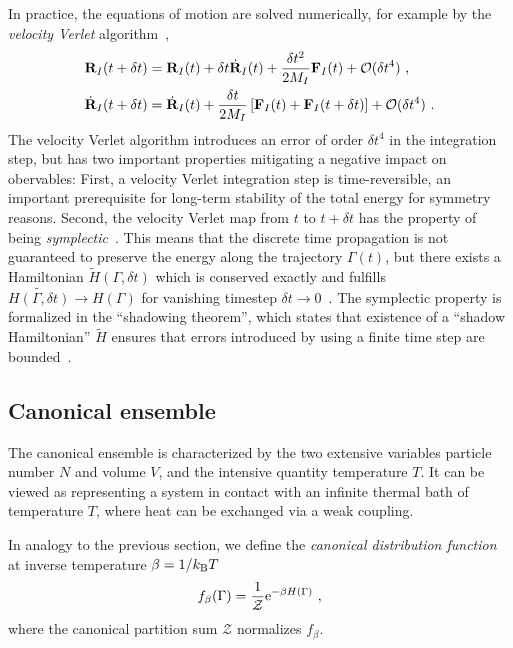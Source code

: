 In practice, the equations of motion are solved numerically, for example by the \emph{velocity Verlet} algorithm~,
\begin{subequations}
\begin{align}
	{\bf R}_I (t + \delta t) 
		&= {\bf R}_I (t) + \delta t \dot{{\bf R}}_I (t) + \frac{\delta t^2}{2 M_I} {\bf F}_I(t) + \mathcal{O} (\delta t^4)~, \\
	\dot{{\bf R}}_I (t + \delta t) 
		&= \dot{{\bf R}}_I (t) + \frac{\delta t}{2 M_I} \left[{\bf F}_I(t) + {\bf F}_I (t + \delta t)\right] + \mathcal{O} (\delta t^4)~.
\end{align}
\label{eq:VelocityVerlet}
\end{subequations}
The velocity Verlet algorithm introduces an error of order $\delta t^4$ in the integration step, but has two important properties mitigating a negative impact on obervables: First, a velocity Verlet integration step is time-reversible, an important prerequisite for long-term stability of the total energy for symmetry reasons. Second, the velocity Verlet map from $t$ to $t + \delta t$ has the property of being \emph{symplectic}~\cite[p.\,101]{Tuckerman}. This means that the discrete time propagation is not guaranteed to preserve the energy along the trajectory $\Gamma(t)$, but there exists a Hamiltonian $\tilde{H} (\Gamma, \delta t)$ which is conserved exactly and fulfills $\tilde{H (\Gamma, \delta t)} \to H(\Gamma)$ for vanishing timestep $\delta t \to 0$~\cite[p.\,121]{Tuckerman}. The symplectic property is formalized in the ``shadowing theorem'', which states that existence of a ``shadow Hamiltonian'' $\tilde H$ ensures that errors introduced by using a finite time step are bounded~.

\subsection{Canonical ensemble}
The canonical ensemble is characterized by the two extensive variables particle number $N$ and volume $V$, and the intensive quantity temperature $T$. It can be viewed as representing a system in contact with an infinite thermal bath of temperature $T$, where heat can be exchanged via a weak coupling.

In analogy to the previous section, we define the \emph{canonical distribution function} at inverse temperature $\beta = 1 / k_{\rm B} T$
\begin{align}
	f_\beta (\Gamma) 
		= \frac{1}{\mathcal{Z}} {\rm e}^{- \beta H (\Gamma)}~,
	\label{eq:f.canonical}
\end{align}
where the  canonical partition sum $\mathcal{Z}$ normalizes $f_\beta$. 

